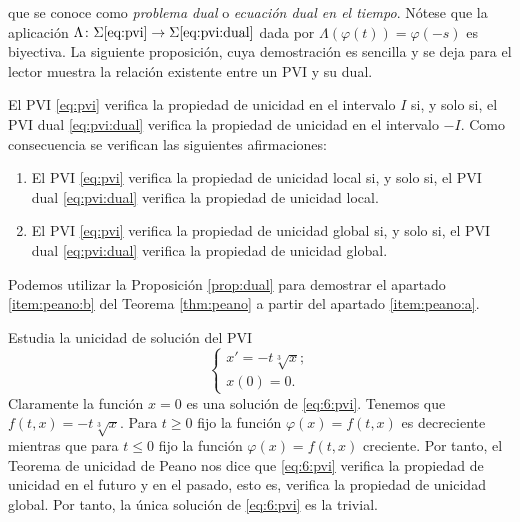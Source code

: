 \documentclass{article}
\begin{document}
que se conoce como \emph{problema dual} o \emph{ecuación dual en el tiempo}. Nótese que la
aplicación $\Lambda \colon \Sigma\eqref{eq:pvi} \to \Sigma\eqref{eq:pvi:dual}$ dada por
$\Lambda(\varphi(t)) = \varphi(-s)$ es biyectiva. La siguiente proposición, cuya demostración es
sencilla y se deja para el lector muestra la relación existente entre un PVI y su dual.

\begin{proposition} \label{prop:dual} El PVI \eqref{eq:pvi} verifica la propiedad de unicidad en el
  intervalo $I$ si, y solo si, el PVI dual \eqref{eq:pvi:dual} verifica la propiedad de unicidad en
  el intervalo $-I$. Como consecuencia se verifican las siguientes afirmaciones:
  
  \begin{enumerate}
  \item El PVI \eqref{eq:pvi} verifica la propiedad de unicidad local si, y solo si, el PVI dual
    \eqref{eq:pvi:dual} verifica la propiedad de unicidad local.
  \item El PVI \eqref{eq:pvi} verifica la propiedad de unicidad global si, y solo si, el PVI dual
    \eqref{eq:pvi:dual} verifica la propiedad de unicidad global.
  \end{enumerate}
\end{proposition}

Podemos utilizar la Proposición \ref{prop:dual} para demostrar el apartado \ref{item:peano:b} del
Teorema \ref{thm:peano} a partir del apartado \ref{item:peano:a}.

\begin{ex}
    Estudia la unicidad de solución del PVI
    \begin{equation} \label{eq:6:pvi}
      \begin{cases}
        x' = -t \sqrt[3]{x}; \\
        x(0) = 0.
      \end{cases}
    \end{equation}
    Claramente la función $x = 0$ es una solución de \eqref{eq:6:pvi}. Tenemos que
    $f(t,x) = - t \sqrt[3] x$. Para $t \ge 0$ fijo la función $\varphi(x) = f(t, x)$ es decreciente
    mientras que para $t \le 0$ fijo la función $\varphi(x) = f(t, x)$ creciente. Por tanto, el
    Teorema de unicidad de Peano nos dice que \eqref{eq:6:pvi} verifica la propiedad de unicidad en
    el futuro y en el pasado, esto es, verifica la propiedad de unicidad global. Por tanto, la única
    solución de \eqref{eq:6:pvi} es la trivial.
\end{ex}
\end{document}
